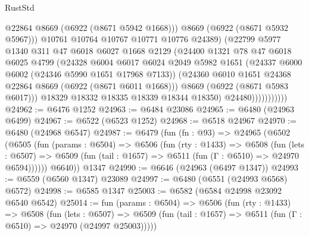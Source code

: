 \begin{lexlean}{RustStd}
\begin{coremodule}
                              @22864
                              @8669
                              (@6922 (@8671 @5942 @1668)))
                            @8669
                            (@6922 (@8671 @5932 @5967)))
                          @10761
                          @10764
                          @10767
                          @10771
                          @10776
                          @24389)
                        (@22799
                          @5977
                          @1340
                          @311
                          @47
                          @6018
                          @6027
                          @1668
                          @2129
                          (@24400
                            @1321
                            @78
                            @47
                            @6018
                            @6025
                            @4799
                            (@24328
                              @6004
                              @6017
                              @6024
                              @2049
                              @5982
                              @1651
                              (@24337 @6000 @6002 (@24346 @5990 @1651 @17968 @7133))
                              (@24360 @6010 @1651 @24368 @22864 @8669 (@6922 (@8671 @6011 @1668)))
                              @8669
                              (@6922 (@8671 @5983 @6017)))
                            @18329
                            @18332
                            @18335
                            @18339
                            @18344
                            @18350)
                          @24480)))))))))))
@24962 := @6476 @1252
@24963 := @6484 @23086
@24965 := @6480 (@24963 @6499)
@24967 := @6522 (@6523 @1252)
@24968 := @6518 @24967
@24970 := @6480 (@24968 @6547)
@24987 := @6479
    (fun (fn : @93) =>
    @24965
      (@6502
        (@6505
          (fun (params : @6504) =>
          @6506
            (fun (rty : @1433) =>
            @6508
              (fun (lets : @6507) =>
              @6509 (fun (tail : @1657) => @6511 (fun (Γ : @6510) => @24970 @6594))))))
        @6640))
    @1347
@24990 := @6646 (@24963 (@6497 @1347))
@24993 := @6559 (@6560 @1347) @23089
@24997 := @6480 (@6551 (@24993 @6568) @6572)
@24998 := @6585 @1347
@25003 := @6582 (@6584 @24998 @23092 @6540 @6542)
@25014 := fun (params : @6504) =>
  @6506
    (fun (rty : @1433) =>
    @6508
      (fun (lets : @6507) =>
      @6509 (fun (tail : @1657) => @6511 (fun (Γ : @6510) => @24970 (@24997 @25003)))))

\end{coremodule}
\end{lexlean}
